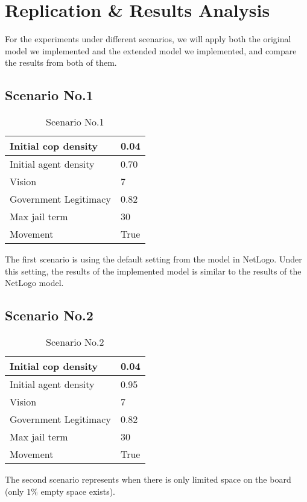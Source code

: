 \documentclass[11pt]{article}
\begin{document}
    \section{Replication \& Results Analysis}
    For the experiments under different scenarios, we will apply both the original
    model we implemented and the extended model we implemented, and compare the
    results from both of them.
    \subsection{Scenario No.1}
     \begin{table}[h]
        \begin{center}
          \begin{tabular}{|l|l|}
          \hline
            Initial cop density & 0.04 \\
          \hline\hline
            Initial agent density & 0.70 \\
          \hline
            Vision & 7 \\
          \hline
            Government Legitimacy & 0.82 \\
          \hline
            Max jail term & 30 \\
          \hline
            Movement & True \\
          \hline
          \end{tabular}
          \caption{Scenario No.1}\label{table1}
        \end{center}
      \end{table}
      The first scenario is using the default setting from the model in 
      NetLogo. Under this setting, the results of the implemented model is
      similar to the results of the NetLogo model. 

      \subsection{Scenario No.2}
      \begin{table}[h]
        \begin{center}
          \begin{tabular}{|l|l|}
          \hline
            Initial cop density & 0.04 \\
          \hline\hline
            Initial agent density & 0.95 \\
          \hline
            Vision & 7 \\
          \hline
            Government Legitimacy & 0.82 \\
          \hline
            Max jail term & 30 \\
          \hline
            Movement & True \\
          \hline
          \end{tabular}
          \caption{Scenario No.2}\label{table2}
        \end{center}
      \end{table}
      The second scenario represents when there is only limited space on the board
      (only $1\%$ empty space exists).
\end{document}
